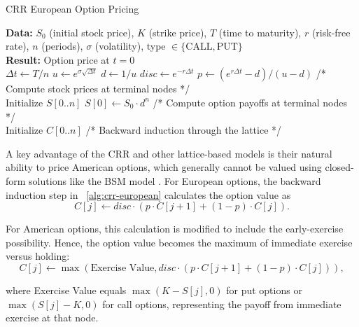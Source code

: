 \documentclass[english,12pt,a4paper,pdftex,sci,utf8]{aaltothesis}
\begin{document}
\begin{algorithm}
\caption{CRR European Option Pricing}
\label{alg:crr-european}
\textbf{Data:} $S_0$ (initial stock price), $K$ (strike price), $T$ (time to maturity), $r$ (risk-free rate), $n$ (periods), $\sigma$ (volatility), type $\in \{\text{CALL}, \text{PUT}\}$\\
\textbf{Result:} Option price at $t=0$\\
$\Delta t \gets T/n$\;
$u \gets e^{\sigma\sqrt{\Delta t}}$\;
$d \gets 1/u$\;
$disc \gets e^{-r\Delta t}$\;
$p \gets (e^{r\Delta t} - d)/(u - d)$\;
/* Compute stock prices at terminal nodes */\\
Initialize $S[0..n]$\;
$S[0] \gets S_0 \cdot d^n$\;
/* Compute option payoffs at terminal nodes */\\
Initialize $C[0..n]$\;
/* Backward induction through the lattice */\\

\;
\end{algorithm}

A key advantage of the CRR and other lattice-based models is their natural ability to price American options, which generally cannot be valued using closed-form solutions like the BSM model \cite{wilmott2013paul}. For European options, the backward induction step in ~\cref{alg:crr-european} calculates the option value as
\begin{equation*}
C[j] \gets disc \cdot (p \cdot C[j+1] + (1-p) \cdot C[j]).
\end{equation*}

For American options, this calculation is modified to include the early-exercise possibility. Hence, the option value becomes the maximum of immediate exercise versus holding:
\begin{equation*}
C[j] \gets \max(\text{Exercise Value}, disc \cdot (p \cdot C[j+1] + (1-p) \cdot C[j])),
\end{equation*}

where Exercise Value equals $\max(K - S[j], 0)$ for put options or $\max(S[j] - K, 0)$ for call options, representing the payoff from immediate exercise at that node.
\end{document}
